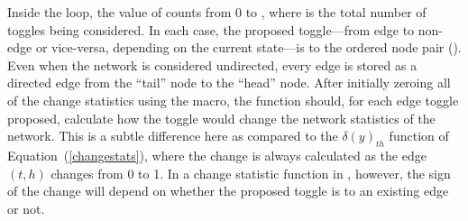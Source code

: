 \documentclass[nojss]{jss}
\begin{document}
Inside the  loop, the value of 
counts from 0 to , where  is the total number of
toggles being considered.  In each case, the proposed toggle---from edge to non-edge
or vice-versa, depending on the current state---is to the
ordered node pair ().  
Even when the network is considered undirected,
every edge is stored as a directed edge from the ``tail'' node to the ``head'' node.
After initially zeroing all of the change statistics using the
 macro, the function should, for each edge
toggle proposed, calculate how the toggle would change the network statistics of the
network.  This is a subtle difference here as compared to  the $\delta(y)_{th}$ function of
Equation~(\ref{changestats}), where the change is always calculated as the edge $(t,h)$
changes from 0 to 1.  In a change statistic function in , however, the sign of the
change will depend on whether the proposed toggle is to an existing edge or not.
\end{document}
